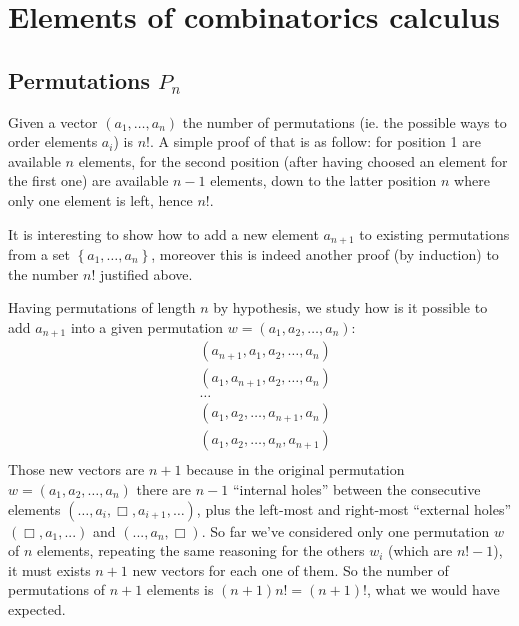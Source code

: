 
\section{Elements of combinatorics calculus}

\subsection{Permutations $P_n$}

Given a vector $\left ( a_1, \ldots, a_n \right) $ the number of
permutations (ie. the possible ways to order elements $a_i$) is
$n!$. A simple proof of that is as follow: for position 1 are
available $n$ elements, for the second position (after having choosed
an element for the first one) are available $n-1$ elements, down
to the latter position $n$ where only one element is left, hence $n!$.

It is interesting to show how to add a new element $a_{n+1}$ to
existing permutations from a set $\left \lbrace a_1, \ldots,
  a_n\right\rbrace $, moreover this is indeed another proof (by induction) to
the number $n!$ justified above.

Having permutations of length $n$ by hypothesis,
we study how is it possible to add $a_{n+1}$ into a
given permutation $w = \left ( a_1, a_2, \ldots, a_n\right) $:
\begin{displaymath}
  \begin{split}
    &\left ( a_{n+1}, a_1, a_2, \ldots, a_n\right)\\
    &\left ( a_1, a_{n+1}, a_2, \ldots, a_n\right)\\
    &\ldots\\
    &\left ( a_1, a_2, \ldots, a_{n+1}, a_n\right)\\
    &\left ( a_1, a_2, \ldots, a_n, a_{n+1}\right)\\
  \end{split}
\end{displaymath}
Those new vectors are $n+1$ because in the original permutation $w =
\left ( a_1, a_2, \ldots, a_n\right) $ there are $n-1$ ``internal
holes'' between the consecutive elements $(\ldots, a_i, \Box,
a_{i+1}, \ldots)$, plus the
left-most and right-most ``external holes'' $(\Box, a_1,...)$ and
$(..., a_n, \Box)$. So far we've considered only one permutation $w$
of $n$ elements, repeating the same reasoning for the others $w_i$
(which are $n!-1$), it must exists $n+1$ new vectors for each one of
them. So the number of permutations of $n+1$ elements is $(n+1)n! =
(n+1)!$, what we would have expected.

